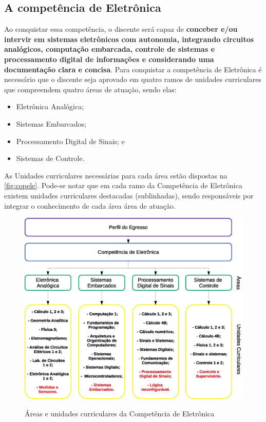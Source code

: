 \subsection{A competência de Eletrônica}

Ao conquistar essa competência, o discente será capaz de \textbf{conceber e/ou intervir em sistemas eletrônicos com autonomia, integrando circuitos analógicos, computação embarcada, controle de sistemas e processamento digital de informações e considerando uma documentação clara e concisa}. Para conquistar a competência de Eletrônica é necessário que o discente seja aprovado em quatro ramos de unidades curriculares que compreendem quatro áreas de atuação, sendo elas:

\begin{itemize}
    \item Eletrônica Analógica;
    \item Sistemas Embarcados;
    \item Processamento Digital de Sinais; e
    \item Sistemas de Controle.
\end{itemize}

As Unidades curriculares necessárias para cada área estão dispostas na \autoref{fig:copele}. Pode-se notar que em cada ramo da Competência de Eletrônica existem unidades curriculares destacadas (sublinhadas), sendo responsáveis por integrar o conhecimento de cada área área de atuação.

\begin{figure}[!htb]
    \centering
    \caption[Áreas e unidades curriculares da Competência de Eletrônica]{Áreas e unidades curriculares da Competência de Eletrônica}
    \includegraphics[width=1.0\textwidth]{Caps/Figs/comp_eletronica.eps}
    \fonte{\utf}
    \label{fig:copele}
\end{figure}

